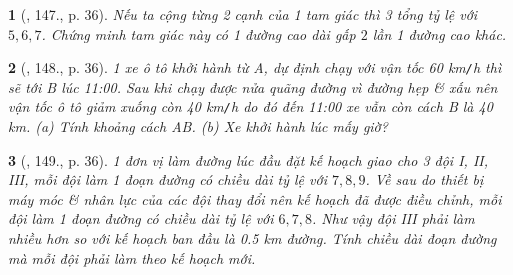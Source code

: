 \documentclass{article}
\newtheorem{baitoan}{}
\begin{document}
\begin{baitoan}[\cite{Tuyen_Toan_7}, 147., p. 36]
	Nếu ta cộng từng 2 cạnh của 1 tam giác thì 3 tổng tỷ lệ với $5,6,7$. Chứng minh tam giác này có 1 đường cao dài gấp $2$ lần 1 đường cao khác.
\end{baitoan}

\begin{baitoan}[\cite{Tuyen_Toan_7}, 148., p. 36]
	1 xe ô tô khởi hành từ A, dự định chạy với vận tốc {\rm60 km{\tt/}h} thì sẽ tới B lúc 11:00. Sau khi chạy được nửa quãng đường vì đường hẹp \& xấu nên vận tốc ô tô giảm xuống còn {\rm40 km{\tt/}h} do đó đến 11:00 xe vẫn còn cách B là {\rm40 km}. (a) Tính khoảng cách AB. (b) Xe khởi hành lúc mấy giờ?
\end{baitoan}

\begin{baitoan}[\cite{Tuyen_Toan_7}, 149., p. 36]
	1 đơn vị làm đường lúc đầu đặt kế hoạch giao cho 3 đội I, II, III, mỗi đội làm 1 đoạn đường có chiều dài tỷ lệ với $7,8,9$. Về sau do thiết bị máy móc \& nhân lực của các đội thay đổi nên kế hoạch đã được điều chỉnh, mỗi đội làm 1 đoạn đường có chiều dài tỷ lệ với $6,7,8$. Như vậy đội III phải làm nhiều hơn so với kế hoạch ban đầu là {\rm0.5 km} đường. Tính chiều dài đoạn đường mà mỗi đội phải làm theo kế hoạch mới.
\end{baitoan}


\printbibliography[heading=bibintoc]
	
\end{document}

